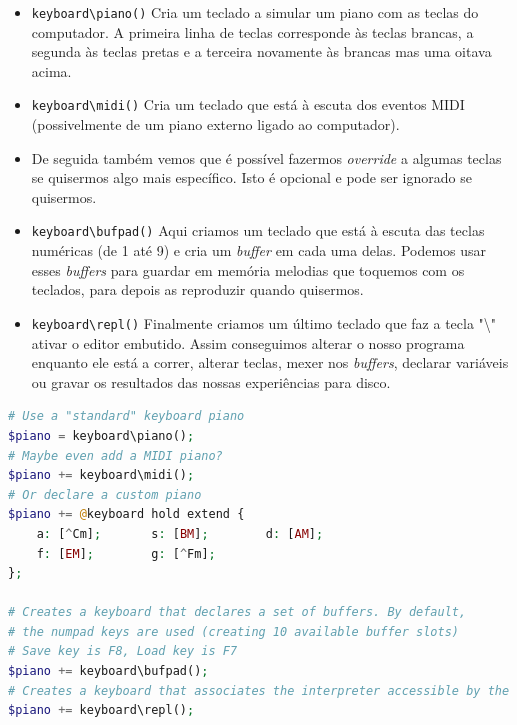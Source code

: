 \begin{itemize}
 \item \texttt{keyboard\textbackslash{}piano()} Cria um teclado a simular um piano com as teclas do computador. A primeira linha de teclas corresponde às teclas brancas, a segunda às teclas pretas e a terceira novamente às brancas mas uma oitava acima.
 \item \texttt{keyboard\textbackslash{}midi()} Cria um teclado que está à escuta dos eventos MIDI (possivelmente de um piano externo ligado ao computador).
 \item De seguida também vemos que é possível fazermos \textit{override} a algumas teclas se quisermos algo mais específico. Isto é opcional e pode ser ignorado se quisermos.
 \item \texttt{keyboard\textbackslash{}bufpad()} Aqui criamos um teclado que está à escuta das teclas numéricas (de 1 até 9) e cria um \textit{buffer} em cada uma delas. Podemos usar esses \textit{buffers} para guardar em memória melodias que toquemos com os teclados, para depois as reproduzir quando quisermos.
 \item \texttt{keyboard\textbackslash{}repl()} Finalmente criamos um último teclado que faz a tecla "\textbackslash{}" ativar o editor embutido. Assim conseguimos alterar o nosso programa enquanto ele está a correr, alterar teclas, mexer nos \textit{buffers}, declarar variáveis ou gravar os resultados das nossas experiências para disco.
\end{itemize}


\begin{lstlisting}[caption=Exemplo da sintaxe proposta da linguagem,language=PHP]
# Use a "standard" keyboard piano
$piano = keyboard\piano();
# Maybe even add a MIDI piano?
$piano += keyboard\midi();
# Or declare a custom piano
$piano += @keyboard hold extend {
    a: [^Cm];       s: [BM];        d: [AM];
    f: [EM];        g: [^Fm];       
};

# Creates a keyboard that declares a set of buffers. By default, 
# the numpad keys are used (creating 10 available buffer slots)
# Save key is F8, Load key is F7
$piano += keyboard\bufpad();
# Creates a keyboard that associates the interpreter accessible by the "\" key
$piano += keyboard\repl();
\end{lstlisting}

